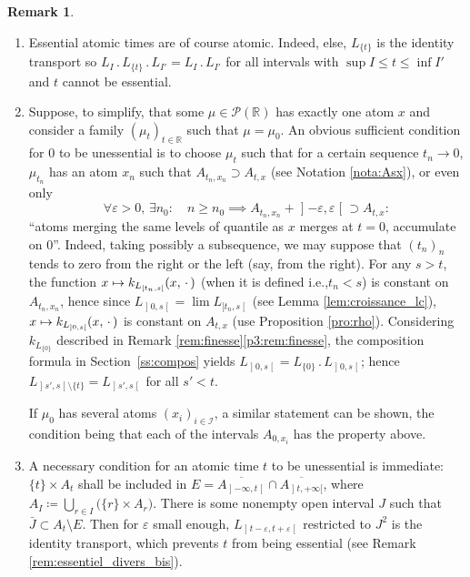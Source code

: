 \documentclass[11pt]{article}
\newcommand{\ie}{i.e.,\xspace}
\newcommand{\skpt}{\smallskip}
\newcommand{\ldot}{\mathbin{.}}
\newcommand\mto{\mathchoice{\longmapsto}{\mapsto}{\mapsto}{\mapsto}}
\theoremstyle{plain}
\theoremstyle{definition}
\newtheorem{rem}[them]{Remark}
\newcommand{\eqdef}{\coloneqq}
\newcommand{\espcdot}{\mbox{$\,\cdot\,$}}
\let\eps\varepsilon
\newcommand{\p}{\mathcal{P}}
\newcommand{\R}{\mathbb{R}}
\newcommand{\op}{\mathopen}
\newcommand{\clo}{\mathclose}
\begin{document}
\pagebreak[2]
\skpt
\begin{rem}\label{rem:essentiel_divers}
\begin{enumerate}
\item
Essential atomic times are of course atomic. Indeed, else, $L_{\{t\}}$ is the identity transport so $L_I\ldot L_{\{t\}}{}\ldot L_{I'}=L_I\ldot L_{I'}$ for all intervals with $\sup I\leqslant t \leqslant \inf I'$ and $t$ cannot be essential.

\item
\label{item:suffisante} Suppose, to simplify, that some $\mu\in\p(\R)$ has exactly one atom $x$ and consider a family $(\mu_t)_{t\in\R}$ such that $\mu=\mu_0$. An obvious sufficient condition for $0$ to be unessential is to choose $\mu_t$ such that for a certain sequence $t_n\to0$, $\mu_{t_n}$ has an atom $x_n$ such that $A_{t_n,x_n}\supset A_{t,x}$ (see Notation \ref{nota:Asx}), or even only
\[
\forall \varepsilon>0,\,\exists n_0:\quad n\geqslant n_0\implies A_{t_n,x_n}+\op]-\varepsilon,\varepsilon\clo[\supset A_{t,x}:
\]
``atoms merging the same levels of quantile as $x$ merges at $t=0$, accumulate on $0$''. Indeed, taking possibly a subsequence, we may suppose that $(t_n)_n$ tends to zero from the right or the left (say, from the right). For any $s>t$, the function $x\mto k_{L_{[t_n,s\clo[}}(x,\espcdot)$ (when it is defined \ie $t_n<s$) is constant on $A_{t_n,x_n}$, hence since $L_{\op]0,s\clo[}=\lim L_{[t_n,s\clo[}$ (see Lemma \ref{lem:croissance_lc}), $x\mto k_{L_{]0,s\clo[}}(x,\espcdot)$ is constant on $A_{t,x}$ (use Proposition \ref{pro:rho}). Considering $k_{L_{\{0\}}}$ described in Remark \ref{rem:finesse}\eqref{p3:rem:finesse}, the composition formula in Section~\ref{ss:compos} yields $L_{\op]0,s\clo[}=L_{\{0\}}{}\ldot L_{\op]0,s\clo[}$; hence $L_{\op]s',s\clo[\setminus\{t\}}=L_{\op]s',s\clo[}$ for all $s'<t$.

If $\mu_0$ has several atoms $(x_i)_{i\in\mathcal{I}}$, a similar statement can be shown, the condition being that each of the intervals $A_{0,x_i}$ has the property above.

\item
\label{item:necessaire} A necessary condition for an atomic time $t$ to be unessential is immediate: $\{t\}\times A_{t}$ shall be included in $E=\overline{A_{\op]-\infty,t\clo[}}\cap\overline{A_{\op]t,+\infty[}}$, where $A_{I}\eqdef\bigcup_{r\in I}\bigl(\{r\}\times A_{r}\bigr)$. There is some nonempty open interval $J$ such that $\bar{J}\subset A_t\setminus E$. Then for $\varepsilon$ small enough, $L_{\op]t-\eps,t+\eps\clo[}$ restricted to $J^2$ is the identity transport, which prevents $t$ from being essential (see Remark \ref{rem:essentiel_divers_bis}).


\end{enumerate}
\end{rem}
\end{document}
